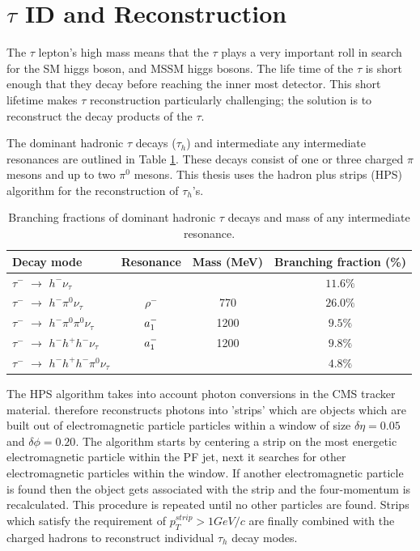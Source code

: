 \section{$\tau$ ID and Reconstruction}
The $\tau$ lepton's high mass means that the $\tau$ plays a very important
roll in search for the SM higgs boson, and MSSM higgs bosons.
The life time of the $\tau$ is short enough that they decay before reaching the inner
most detector. This short lifetime makes $\tau$ reconstruction particularly challenging;
the solution is to reconstruct the decay products of the $\tau$. 

The dominant hadronic $\tau$ decays ($\tau_{h}$) 
and intermediate any intermediate resonances are 
outlined in Table \ref{tab:decay_modes}. 
These decays consist of one or three charged $\pi$ mesons and up to two $\pi^{0}$ mesons.
This thesis uses the hadron plus strips (HPS) algorithm for the reconstruction of 
$\tau_{h}$'s. %
\begin{table}[b]
\begin{center}
\begin{tabular}{|l|c|c|c|}
\hline
Decay mode & Resonance & Mass (MeV) &  Branching fraction (\%) \\
\hline
$\tau^{-}$  $\rightarrow $  $h^{-} \nu_{\tau}$ &  &  & $11.6\%$ \\
$\tau^{-}$  $\rightarrow $  $h^{-} \pi^{0}  \nu_{\tau}$ & $\rho^{-}$ & 770 & $26.0\%$ \\
$\tau^{-}$  $\rightarrow $  $h^{-} \pi^{0}\pi^{0}  \nu_{\tau}$ & $a_{\rm{1}}^{-}$ & 1200 & $9.5\%$ \\
$\tau^{-}$  $\rightarrow $  $h^{-} h^{+} h^{-} \nu_{\tau}$ & $a_{\rm{1}}^{-}$  & 1200 & $9.8\%$ \\
$\tau^{-}$  $\rightarrow $  $h^{-} h^{+} h^{-}\pi^{0}  \nu_{\tau}$ & & & $4.8\%$ \\
      \hline
\end{tabular}
\caption{
   Branching fractions of dominant hadronic $\tau$ decays and mass of any intermediate resonance. 
   }
\label{tab:decay_modes}
\end{center}
\end{table}
The HPS algorithm takes into account photon conversions in the CMS tracker
material. %
therefore %
reconstructs photons into 'strips' which are objects which are built%
out of electromagnetic particle particles within a window of size $\delta\eta=0.05$
and $\delta\phi=0.20$. The algorithm starts by centering a strip on the
most energetic electromagnetic particle within the PF jet, next it searches
for other electromagnetic particles within the window. If another electromagnetic
particle is found then the object gets associated with the strip and
the four-momentum is recalculated. This procedure is repeated until no other
particles are found. Strips which satisfy the requirement of $p_{T}^{strip}>1GeV/c$
are finally combined with the charged hadrons to reconstruct individual
$\tau_{h}$ decay modes.

